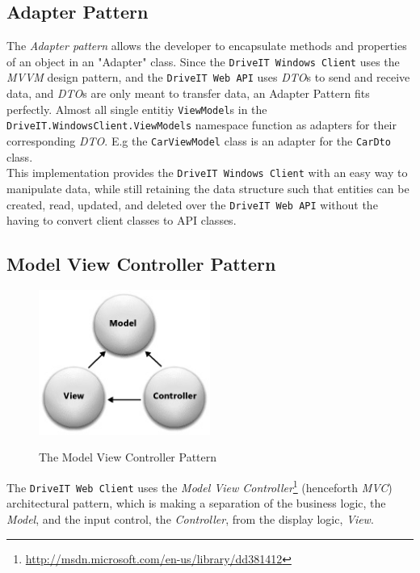 \subsection{Adapter Pattern}
The \textit{Adapter pattern} allows the developer to encapsulate methods and properties of an object in an "Adapter" class. Since the \texttt{DriveIT Windows Client} uses the \textit{MVVM} design pattern, and the \texttt{DriveIT Web API} uses \textit{DTO}s to send and receive data, and \textit{DTO}s are only meant to transfer data, an Adapter Pattern fits perfectly. Almost all single entitiy \texttt{ViewModel}s in the \texttt{DriveIT.WindowsClient.ViewModels} namespace function as adapters for their corresponding \textit{DTO}. E.g the \texttt{CarViewModel} class is an adapter for the \texttt{CarDto} class.\\ 

This implementation provides the \texttt{DriveIT Windows Client} with an easy way to manipulate data, while still retaining the data structure such that entities can be created, read, updated, and deleted over the \texttt{DriveIT Web API} without the having to convert client classes to API classes.

\subsection{Model View Controller Pattern}
\label{sec:MVC}
\begin{figure}[H]
	\centering
	\includegraphics[width=0.5\textwidth]{Figures/WebImages/MVCPattern}\\
	\caption{The Model View Controller Pattern}
	\label{fig:MVCPattern}
\end{figure}
The \texttt{DriveIT Web Client} uses the \textit{Model View Controller}\footnote{\url{http://msdn.microsoft.com/en-us/library/dd381412}} (henceforth \textit{MVC}) architectural pattern, which is making a separation of the business logic, the \textit{Model}, and the input control, the \textit{Controller}, from the display logic, \textit{View}.

